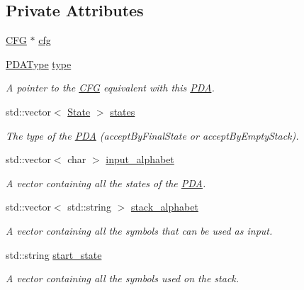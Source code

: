 \subsection*{\-Private \-Attributes}
\begin{DoxyCompactItemize}
\item 
\hyperlink{classCFG}{\-C\-F\-G} $\ast$ \hyperlink{classPDA_1_1PDA_aef026ff20ec36b368db8cf05dc7d6ef7}{cfg}
\item 
\hyperlink{namespacePDA_a2f2b17cdf30facf6f0fe593ab209acf8}{\-P\-D\-A\-Type} \hyperlink{classPDA_1_1PDA_a15524b46d2be399f384b0f236ccb38f4}{type}
\begin{DoxyCompactList}\small\item\em \-A pointer to the \hyperlink{classCFG}{\-C\-F\-G} equivalent with this \hyperlink{classPDA_1_1PDA}{\-P\-D\-A}. \end{DoxyCompactList}\item 
std\-::vector$<$ \hyperlink{classPDA_1_1State}{\-State} $>$ \hyperlink{classPDA_1_1PDA_a38d40f2c938f18d396ea2b13ca361271}{states}
\begin{DoxyCompactList}\small\item\em \-The type of the \hyperlink{classPDA_1_1PDA}{\-P\-D\-A} (accept\-By\-Final\-State or accept\-By\-Empty\-Stack). \end{DoxyCompactList}\item 
std\-::vector$<$ char $>$ \hyperlink{classPDA_1_1PDA_a54db260eece0bfe0d5aad0ef13f18a02}{input\-\_\-alphabet}
\begin{DoxyCompactList}\small\item\em \-A vector containing all the states of the \hyperlink{classPDA_1_1PDA}{\-P\-D\-A}. \end{DoxyCompactList}\item 
std\-::vector$<$ std\-::string $>$ \hyperlink{classPDA_1_1PDA_a90a4f96e28003d5bfa4d67b4c7a191b5}{stack\-\_\-alphabet}
\begin{DoxyCompactList}\small\item\em \-A vector containing all the symbols that can be used as input. \end{DoxyCompactList}\item 
std\-::string \hyperlink{classPDA_1_1PDA_af346efb9a6812d704d69299eef9262e6}{start\-\_\-state}
\begin{DoxyCompactList}\small\item\em \-A vector containing all the symbols used on the stack. \end{DoxyCompactList}\item 

\end{DoxyCompactItemize}
